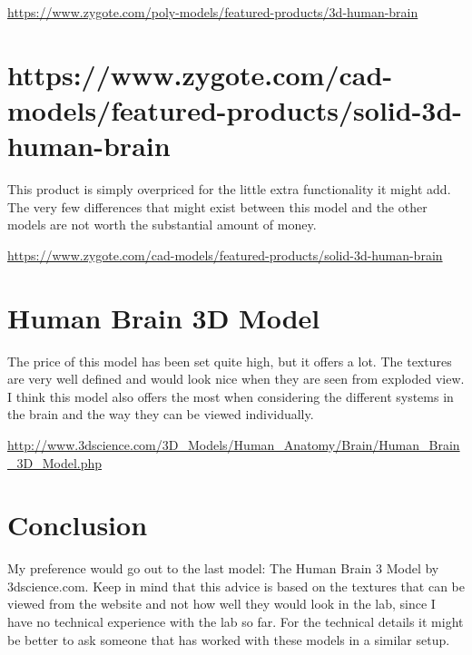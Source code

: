 \documentclass[10pt,a4paper]{article}
\begin{document}
\url{https://www.zygote.com/poly-models/featured-products/3d-human-brain}

\section{https://www.zygote.com/cad-models/featured-products/solid-3d-human-brain}

This product is simply overpriced for the little extra functionality it might add. The very few differences that might exist between this model and the other models are not worth the substantial amount of money.

\url{https://www.zygote.com/cad-models/featured-products/solid-3d-human-brain}

\section{Human Brain 3D Model}
The price of this model has been set quite high, but it offers a lot. The textures are very well defined and would look nice when they are seen from exploded view. I think this model also offers the most when considering the different systems in the brain and the way they can be viewed individually.

\url{http://www.3dscience.com/3D_Models/Human_Anatomy/Brain/Human_Brain_3D_Model.php}

\section{Conclusion}
My preference would go out to the last model: The Human Brain 3 Model by 3dscience.com. Keep in mind that this advice is based on the textures that can be viewed from the website and not how well they would look in the lab, since I have no technical experience with the lab so far. For the technical details it might be better to ask someone that has worked with these models in a similar setup.
\end{document}
